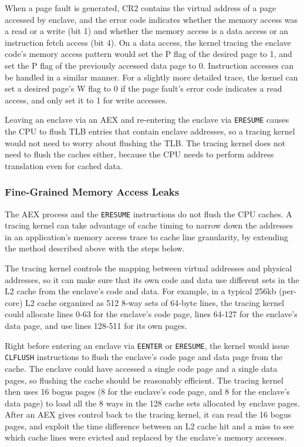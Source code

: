 When a page fault is generated, CR2 contains the virtual address of a page
accessed by enclave, and the error code indicates whether the memory access was
a read or a write (bit 1) and whether the memory access is a data access or
an instruction fetch access (bit 4). On a data access, the kernel tracing the
enclave code's memory access pattern would set the P flag of the desired page
to 1, and set the P flag of the previously accessed data page to 0. Instruction
accesses can be handled in a similar manner. For a slightly more detailed
trace, the kernel can set a desired page's W flag to 0 if the page fault's
error code indicates a read access, and only set it to 1 for write accesses.

Leaving an enclave via an AEX and re-entering the enclave via \texttt{ERESUME}
causes the CPU to flush TLB entries that contain enclave addresses, so a
tracing kernel would not need to worry about flushing the TLB. The tracing
kernel does not need to flush the caches either, because the CPU needs to
perform address translation even for cached data.

\subsubsection{Fine-Grained Memory Access Leaks}

The AEX process and the \texttt{ERESUME} instructions do not flush the CPU
caches. A tracing kernel can take advantage of cache timing to narrow down
the addresses in an application's memory access trace to cache line
granularity, by extending the method described above with the steps below.

The tracing kernel controls the mapping between virtual addresses and physical
addresses, so it can make sure that its own code and data use different sets
in the L2 cache from the enclave's code and data. For example, in a typical
256kb (per-core) L2 cache organized as 512 8-way sets of 64-byte lines, the
tracing kernel could allocate lines 0-63 for the enclave's code page, lines
64-127 for the enclave's data page, and use lines 128-511 for its own pages.

Right before entering an enclave via \texttt{EENTER} or \texttt{ERESUME}, the
kernel would issue \texttt{CLFLUSH} instructions to flush the enclave's code
page and data page from the cache. The enclave could have accessed a single
code page and a single data pages, so flushing the cache should be reasonably
efficient. The tracing kernel then uses 16 bogus pages (8 for the enclave's
code page, and 8 for the enclave's data page) to load all the 8 ways in the 128
cache sets allocated by enclave pages. After an AEX gives control back to the
tracing kernel, it can read the 16 bogus pages, and exploit the time difference
between an L2 cache hit and a miss to see which cache lines were evicted and
replaced by the enclave's memory accesses.

